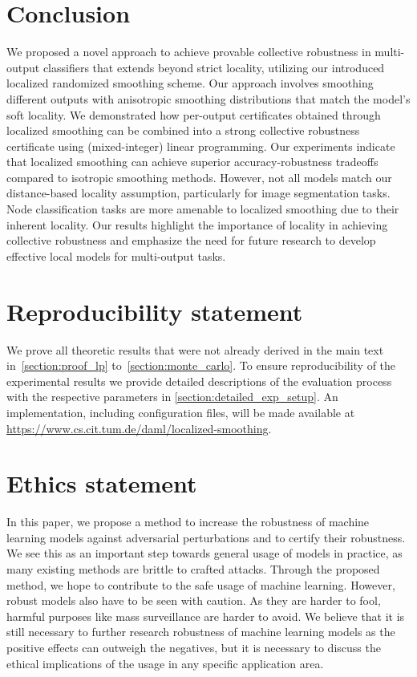 \documentclass{article} %
\theoremstyle{plain}
\theoremstyle{definition}
\theoremstyle{remark}
\begin{document}
\section{Conclusion}
We proposed a novel approach to achieve provable collective robustness in multi-output classifiers that extends beyond strict locality, utilizing our introduced localized randomized smoothing scheme. %
Our approach involves smoothing different outputs with anisotropic smoothing distributions that match the model's soft locality. We demonstrated how per-output certificates obtained through localized smoothing can be combined into a strong collective robustness certificate using (mixed-integer) linear programming.
Our experiments indicate that localized smoothing can achieve superior accuracy-robustness tradeoffs compared to isotropic smoothing methods. However, not all models match our distance-based locality assumption, particularly for image segmentation tasks. Node classification tasks are more amenable to localized smoothing due to their inherent locality. Our results highlight the importance of locality in achieving collective robustness and emphasize the need for future research to develop effective local models for multi-output tasks.

\clearpage
\section{Reproducibility statement}
We prove all theoretic results that were not already derived in the main text in~\autoref{section:proof_lp} to~\autoref{section:monte_carlo}.
To ensure reproducibility of the experimental results we provide detailed descriptions of the evaluation process with the respective parameters in \autoref{section:detailed_exp_setup}. An implementation, including configuration files, will be made available at 
\href{https://www.cs.cit.tum.de/daml/localized-smoothing/}{https://www.cs.cit.tum.de/daml/localized-smoothing}.

\section{Ethics statement}
In this paper, we propose a method  to increase the robustness of machine learning models against adversarial perturbations and to certify their robustness. We see this as an important step towards general usage of models in practice, as many existing methods are brittle to crafted attacks. Through the proposed method, we hope to contribute to the safe usage of machine learning.
However, robust models also have to be seen with caution. As they are harder to fool, harmful purposes like mass surveillance are harder to avoid. We believe that it is still necessary to further research robustness of machine learning models as the positive effects can outweigh the negatives, but it is necessary to discuss the ethical implications of the usage in any specific application area.
\end{document}
